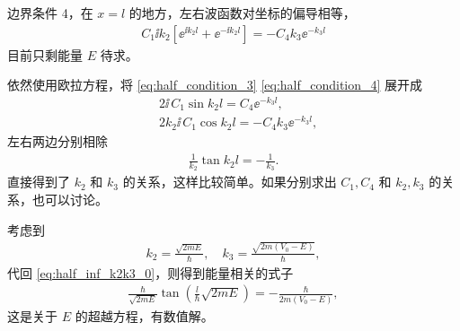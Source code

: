 边界条件 4，在 $x=l$ 的地方，左右波函数对坐标的偏导相等，
\begin{eqnarray}
    C_1 \ii k_2 \left[
        \ee^{\ii k_2 l} + \ee^{-\ii k_2 l} 
    \right] = - C_4 k_3 \ee^{-k_3 l} \label{eq:half_condition_4}
\end{eqnarray}
目前只剩能量 $E$ 待求。

依然使用欧拉方程，将 \eqref{eq:half_condition_3} \eqref{eq:half_condition_4} 展开成
\begin{align}
    & 2\ii \,C_1 \sin k_2l = C_4 \ee^{-k_3 l}, \\
    & 2 k_2 \ii \, C_1 \cos k_2 l = - C_4 k_3 \ee^{-k_3 l}, 
\end{align}
左右两边分别相除
\begin{eqnarray}
    \frac1{k_2} \tan k_2l = - \frac1{k_3}. 
    \label{eq:half_inf_k2k3_0}
\end{eqnarray}
直接得到了 $k_2$ 和 $k_3$ 的关系，这样比较简单。如果分别求出 $C_1, C_4$ 和 $k_2, k_3$ 的关系，也可以讨论。

考虑到
\begin{eqnarray}
    k_2 = \frac{\sqrt{2mE}}{\hbar}, \quad k_3 = \frac{\sqrt{2m(V_0- E)}}{\hbar}, \label{eq:half_inf_k2k3_def}
\end{eqnarray}
代回 \eqref{eq:half_inf_k2k3_0}，则得到能量相关的式子
\begin{eqnarray}
    \frac{\hbar}{\sqrt{2mE}} \tan \left(
        \frac l{\hbar} \sqrt{2mE}
    \right)
    = - \frac{\hbar}{2m(V_0 - E)},
    \label{eq:half_inf_k2k3_transcendental}
\end{eqnarray}
这是关于 $E$ 的超越方程，有数值解。

